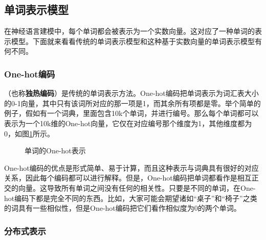 \subsection{单词表示模型}

\parinterval  在神经语言建模中，每个单词都会被表示为一个实数向量。这对应了一种单词的表示模型。下面就来看看传统的单词表示模型和这种基于实数向量的单词表示模型有何不同。


\subsubsection{One-hot编码}

（也称{\small\sffamily\bfseries{独热编码}}）是传统的单词表示方法。One-hot编码把单词表示为词汇表大小的0-1向量，其中只有该词所对应的那一项是1，而其余所有项都是零。举个简单的例子，假如有一个词典，里面包含10k个单词，并进行编号。那么每个单词都可以表示为一个10k维的One-hot向量，它仅在对应编号那个维度为1，其他维度都为0，如图\ref{fig:5-64}所示。

\begin{figure}[htp]
\centering

\caption{单词的One-hot表示 }
\label{fig:5-64}
\end{figure}

\parinterval  One-hot编码的优点是形式简单、易于计算，而且这种表示与词典具有很好的对应关系，因此每个编码都可以进行解释。但是，One-hot编码把单词都看作是相互正交的向量。这导致所有单词之间没有任何的相关性。只要是不同的单词，在One-hot编码下都是完全不同的东西。比如，大家可能会期望诸如``桌子''和``椅子''之类的词具有一些相似性，但是One-hot编码把它们看作相似度为0的两个单词。


\subsubsection{分布式表示}

